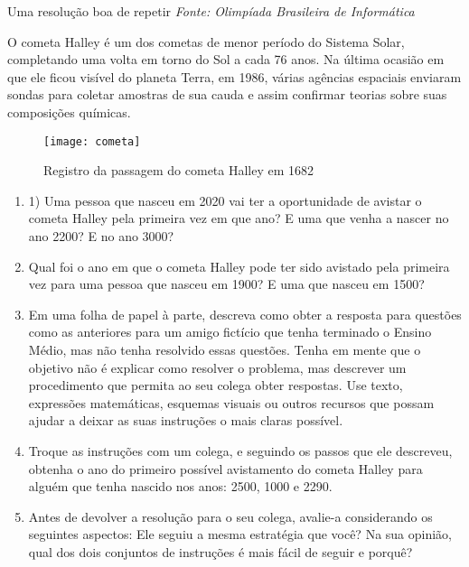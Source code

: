 \begin{task}{Uma resolução boa de repetir}
\label{comp-task2}
\textit{Fonte: Olimpíada Brasileira de Informática}

O cometa Halley é um dos cometas de menor período do Sistema Solar, completando uma volta em torno do Sol a cada 76 anos. Na última ocasião em que ele ficou visível do planeta Terra, em 1986, várias agências espaciais enviaram sondas para coletar amostras de sua cauda e assim confirmar teorias sobre suas composições químicas.

\begin{figure}[H]
\centering
\texttt{[image: cometa]}
\caption{Registro da passagem do cometa Halley em 1682}
\end{figure}

\begin{enumerate}
\item 1) Uma pessoa que nasceu em 2020 vai ter a oportunidade de avistar o cometa Halley pela primeira vez em que ano? E uma que venha a nascer no ano 2200? E no ano 3000?

\item Qual foi o ano em que o cometa Halley pode ter sido avistado pela primeira vez para uma pessoa que nasceu em 1900? E uma que nasceu em 1500?

\item Em uma folha de papel à parte, descreva como obter a resposta para questões como as anteriores para um amigo fictício que tenha terminado o Ensino Médio, mas não tenha resolvido essas questões. Tenha em mente que o objetivo não é explicar como resolver o problema, mas descrever um procedimento que permita ao seu colega obter respostas. Use texto, expressões matemáticas, esquemas visuais ou outros recursos que possam ajudar a deixar as suas instruções o mais claras possível.

\item Troque as instruções com um colega, e seguindo os passos que ele descreveu, obtenha o ano do primeiro possível avistamento do cometa Halley para alguém que tenha nascido nos anos: 2500, 1000 e 2290.

\item Antes de devolver a resolução para o seu colega, avalie-a considerando os seguintes aspectos: Ele seguiu a mesma estratégia que você? Na sua opinião, qual dos dois conjuntos de instruções é mais fácil de seguir e porquê?
\end{enumerate}

\end{task}



